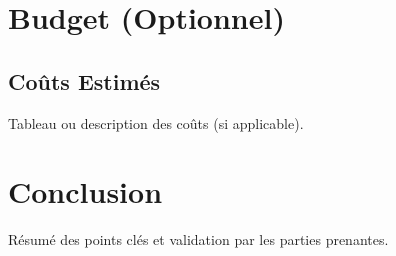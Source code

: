 \documentclass[a4paper, 12pt]{report}
\begin{document}
\chapter{Budget (Optionnel)}
\section{Coûts Estimés}
Tableau ou description des coûts (si applicable).

\chapter*{Conclusion}
Résumé des points clés et validation par les parties prenantes.
\end{document}
